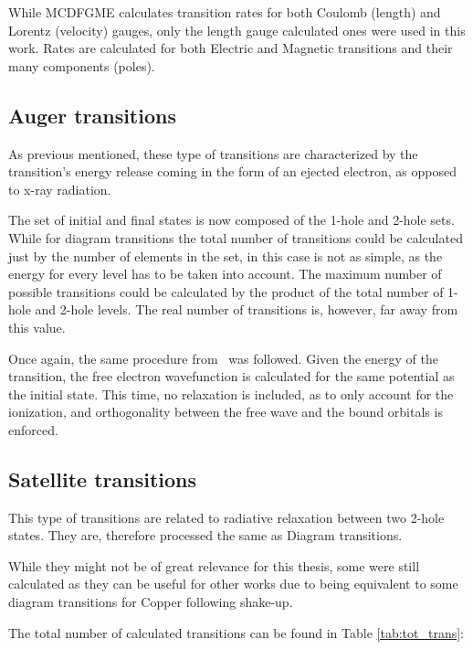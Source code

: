 While \gls{MCDFGME} calculates transition rates for both Coulomb (length) and Lorentz (velocity) gauges, only the length gauge calculated ones were used in this work. Rates are calculated for both Electric and Magnetic transitions and their many components (poles).

\subsection{Auger transitions}

As previous mentioned, these type of transitions are characterized by the transition's energy release coming in the form of an ejected electron, as opposed to x-ray radiation.

The set of initial and final states is now composed of the 1-hole and 2-hole sets. While for diagram transitions the total number of transitions could be calculated just by the number of elements in the set, in this case is not as simple, as the energy for every level has to be taken into account. The maximum number of possible transitions could be calculated by the product of the total number of 1-hole and 2-hole levels. The real number of transitions is, however, far away from this value.

Once again, the same procedure from~\cite{Guerra2021,Pinheiro2023} was followed. Given the energy of the transition, the free electron wavefunction is calculated for the same potential as the initial state. This time, no relaxation is included, as to only account for the ionization, and orthogonality between the free wave and the bound orbitals is enforced.


\subsection{Satellite transitions}
This type of transitions are related to radiative relaxation between two 2-hole states. They are, therefore processed the same as Diagram transitions.

While they might not be of great relevance for this thesis, some were still calculated as they can be useful for other works due to being equivalent to some diagram transitions for Copper following shake-up.


The total number of calculated transitions can be found in Table \ref{tab:tot_trans}:


